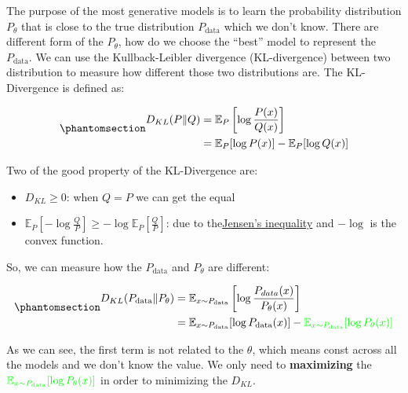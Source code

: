\documentclass[
  12pt,
]{article}
\providecommand{\tightlist}{%
  \setlength{\itemsep}{0pt}\setlength{\parskip}{0pt}}\usepackage{longtable,booktabs,array}
\theoremstyle{plain}
\theoremstyle{remark}
\begin{document}
The purpose of the most generative models is to learn the probability
distribution \(P_\theta\) that is close to the true distribution
\(P_\text{data}\) which we don't know. There are different form of the
\(P_\theta\), how do we choose the ``best'' model to represent the
\(P_\text{data}\). We can use the Kullback-Leibler divergence
(KL-divergence) between two distribution to measure how different those
two distributions are. The KL-Divergence is defined as:

\begin{equation}\phantomsection\label{eq-kl-divergence}{
\begin{split}D_{KL} (P\| Q ) & = \mathbb{E}_{P}\left[ \log \frac{P(x)}{Q(x)} \right]  \\& = \mathbb{E}_{P}[\log P(x)] - \mathbb{E}_{P}[\log Q(x)]\end{split}
}\end{equation}

Two of the good property of the KL-Divergence are:

\begin{itemize}
\tightlist
\item
  \(D_{KL} \geq 0\): when \(Q = P\) we can get the equal
\item
  \(\mathbb{E}_{P}\left[ - \log \frac{Q}{P} \right] \geq -\log \mathbb{E}_{P}\left[ \frac{Q}{P} \right]\):
  due to
  the\href{https://en.wikipedia.org/wiki/Jensen\%27s_inequality}{Jensen's
  inequality} and \(-\log\) is the convex function.
\end{itemize}

So, we can measure how the \(P_{\text{data}}\) and \(P_{\theta}\) are
different:

\begin{equation}\phantomsection\label{eq-kl-of-two-model-and-true}{
\begin{split}D_{KL}(P_{\text{data}} \| P_{\theta}) & = \mathbb{E}_{x \sim P_{\text{data}}} \left[ \log \frac{P_{data}(x)}{P_{\theta}(x)} \right] \\ &=   \mathbb{E}_{x \sim P_{\text{data}}} [\log P_{\text{data}}(x)] - \textcolor{green}{\mathbb{E}_{x \sim P_{\text{data}}} [\log P_{\theta}(x)]}\\\end{split}
}\end{equation}

As we can see, the first term is not related to the \(\theta\), which
means const across all the models and we don't know the value. We only
need to \textbf{maximizing} the
\(\textcolor{green}{\mathbb{E}_{x \sim P_{\text{data}}} [\log P_{\theta}(x)]}\)
in order to minimizing the \(D_{KL}\).
\end{document}
